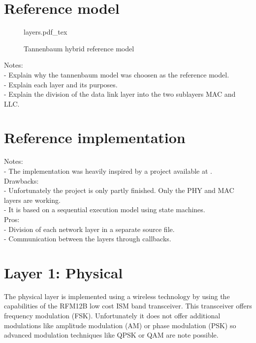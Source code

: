 \section{Reference model}

\begin{figure}[H]
    \centering
    {layers.pdf_tex}
    \caption{Tannenbaum hybrid reference model \cite{tannenbaum}}
    \label{fig:tannenbaum_model}
\end{figure}

Notes:\\
- Explain why the tannenbaum model was choosen as the reference model. \\
- Explain each layer and its purposes. \\
- Explain the division of the data link layer into the two sublayers MAC and LLC. \\

\section{Reference implementation}
Notes:\\
- The implementation was heavily inspired by a project available at \cite{stahl}. \\

Drawbacks: \\
- Unfortunately the project is only partly finished. Only the PHY and MAC layers are working. \\
- It is based on a sequential execution model using state machines. \\

Pros: \\
- Division of each network layer in a separate source file. \\
- Communication between the layers through callbacks. \\

\section{Layer 1: Physical}
The physical layer is implemented using a wireless technology by using the capabilities of the RFM12B low cost ISM band transceiver. This transceiver offers frequency modulation (FSK). Unfortunately it does not offer additional modulations like amplitude modulation (AM) or phase modulation (PSK) so advanced modulation techniques like QPSK or QAM are note possible. 

